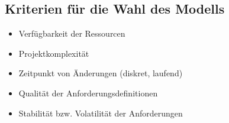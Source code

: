 \subsection{Kriterien für die Wahl des Modells}
\begin{itemize}
	\item Verfügbarkeit der Ressourcen
	\item Projektkomplexität
	\item Zeitpunkt von Änderungen (diskret, laufend)
	\item Qualität der Anforderungsdefinitionen
	\item Stabilität bzw. Volatilität der Anforderungen
\end{itemize}
